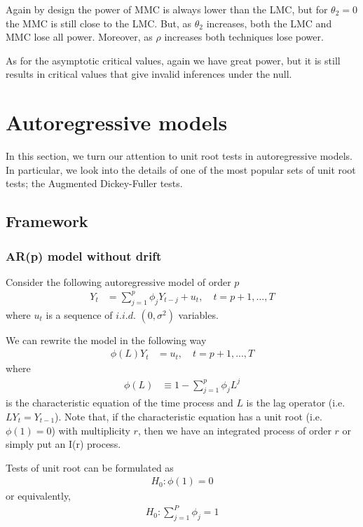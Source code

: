 \documentclass[11pt]{article}\usepackage[]{graphicx}\usepackage[]{color}
\begin{document}
Again by design the power of MMC is always lower than the LMC, but for $\theta_2=0$ the MMC is still close to the LMC. But, as $\theta_2$ increases, both the LMC and MMC lose all power. Moreover, as $\rho$ increases both techniques lose power.

As for the asymptotic critical values, again we have great power, but it is still results in critical values that give invalid inferences under the null.

\section{Autoregressive models}

In this section, we turn our attention to unit root tests in autoregressive models. In particular, we look into the details of one of the most popular sets of unit root tests; the Augmented Dickey-Fuller tests.

\subsection{Framework}

\subsubsection{AR(p) model without drift}

Consider the following autoregressive model of order $p$
\begin{align}
	\label{eq:nc:AR}
	Y_t & = \sum_{j=1}^{p} \phi_j Y_{t-j} + u_t, \quad t = p + 1, ... , T
\end{align}
where $u_t$ is a sequence of $i.i.d.$ $(0,\sigma^2)$ variables.

We can rewrite the model in the following way
\begin{align}
	\phi(L) Y_t & =  u_t, \quad t = p + 1, ... , T
\end{align}
where
\begin{align}
	\phi(L) &\equiv	1-\sum_{j=1}^{p} \phi_j L^j
\end{align}
is the characteristic equation of the time process and $L$ is the lag operator (i.e. $L Y_t = Y_{t-1}$). Note that, if the characteristic equation has a unit root (i.e. $\phi(1)=0$) with multiplicity $r$, then we have an integrated process of order $r$ or simply put an I(r) process.

Tests of unit root can be formulated as
\begin{align}
	H_0: \phi(1)=0
\end{align}
or equivalently,
\begin{align}
	H_0: \sum_{j=1}^{P} \phi_{j} = 1
\end{align}
\end{document}
